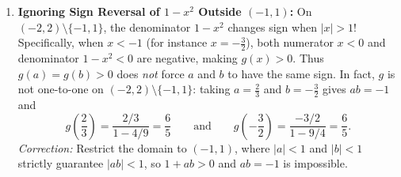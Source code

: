 \documentclass[11pt, letterpaper]{article}
\theoremstyle{definition}
\theoremstyle{remark}
\begin{document}
\begin{enumerate}[label=\textbf{Flaw \arabic*:}]
    \item \textbf{Ignoring Sign Reversal of $1 - x^2$ Outside $(-1, 1)$:}
    On $(-2, 2) \setminus \{-1, 1\}$, the denominator $1 - x^2$ changes sign when $|x| > 1$! Specifically, when $x < -1$ (for instance $x = -\frac{3}{2}$), both numerator $x < 0$ and denominator $1 - x^2 < 0$ are negative, making $g(x) > 0$. Thus $g(a) = g(b) > 0$ does \emph{not} force $a$ and $b$ to have the same sign. In fact, $g$ is not one-to-one on $(-2, 2) \setminus \{-1, 1\}$: taking $a = \frac{2}{3}$ and $b = -\frac{3}{2}$ gives $ab = -1$ and
    \[
    g\!\left(\frac{2}{3}\right) = \frac{2/3}{1 - 4/9} = \frac{6}{5} \qquad \text{and} \qquad g\!\left(-\frac{3}{2}\right) = \frac{-3/2}{1 - 9/4} = \frac{6}{5}.
    \]
    \emph{Correction:} Restrict the domain to $(-1, 1)$, where $|a| < 1$ and $|b| < 1$ strictly guarantee $|ab| < 1$, so $1 + ab > 0$ and $ab = -1$ is impossible.
\end{enumerate}
\end{document}

